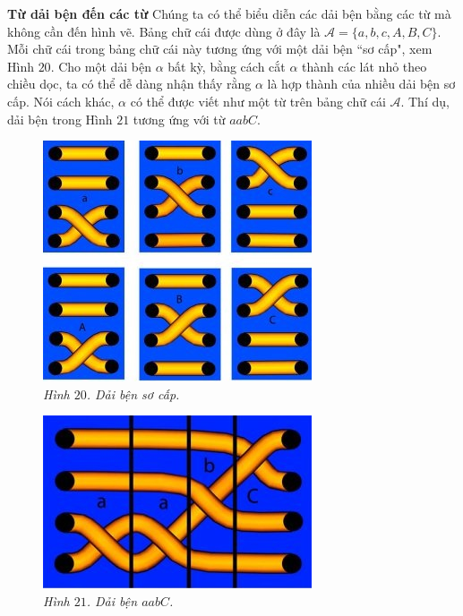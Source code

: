 \begin{multicols}{2}
	\vskip 0.1cm
	\textbf{\color{duongvaotoanhoc}Từ dải bện đến các từ}
	\vskip 0.1cm
	Chúng ta có thể biểu diễn các dải bện bằng các từ mà không cần đến hình vẽ. Bảng chữ cái được dùng ở đây là $\mathcal A = \{a, b, c, A, B, C\}$. Mỗi chữ cái trong bảng chữ cái này tương ứng với một dải bện ``sơ cấp", xem Hình $20$. Cho một dải bện $\alpha$ bất kỳ, bằng cách cắt $\alpha$ thành các lát nhỏ theo chiều dọc, ta có thể dễ dàng nhận thấy rằng $\alpha$ là hợp thành của nhiều dải bện sơ cấp. Nói cách khác, $\alpha$ có thể được viết như một từ trên bảng chữ cái $\mathcal A$. Thí dụ, dải bện trong Hình $21$ tương ứng với từ $aabC$.
	\begin{figure}[H]
		\vspace*{-5pt}
		\centering
		\captionsetup{labelformat= empty, justification=centering}
		\includegraphics[width= 0.65\linewidth]{fig_20}
		\caption{\small\textit{\color{duongvaotoanhoc}Hình $20$. Dải bện sơ cấp.}}
	\end{figure}
	\begin{figure}[H]
		\vspace*{5pt}
		\centering
		\captionsetup{labelformat= empty, justification=centering}
		\includegraphics[width= 0.48\linewidth]{fig_21}
		\caption{\small\textit{\color{duongvaotoanhoc}Hình $21$. Dải bện $aabC$.}}
		\vspace*{-10pt}

\end{figure}
\end{multicols}
